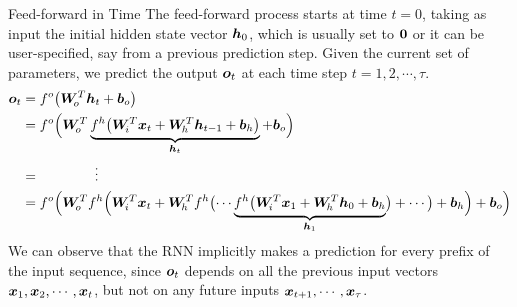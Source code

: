 %
\begin{frame}{Feed-forward in Time}
%
The feed-forward process starts at time $t=0$, taking as input the initial
hidden state vector ${\boldsymbol h}_0$, which is usually set to $\mathbf{0}$ or it can be
user-specified, say from a previous prediction step. Given the current set
of parameters, we predict the output ${\boldsymbol o}_t$ at each time step $t=1,2,\cdots,
\tau$.%
\begin{align*}
    \bo_t & = f^o \bigl( \bW_{\!o}^T \bh_t + \bb_{o} \bigr)\\
    & = f^o \Bigl( \bW_{\!o}^T 
        \underbrace{f^h \bigl(\bW_{\!i}^T \bx_t + \bW_{\!h}^T
        \bh_{t-1} + \bb_{h}\bigr)}_{\bh_t}
    + \bb_{o} \Bigr)\\
    & = \qquad \qquad \vdots\\
    & = f^o \Bigl( \bW_{\!o}^T 
        f^h \Bigl(\bW_{\!i}^T \bx_t + \bW_{\!h}^T
         f^h\bigl( \cdots 
           \underbrace{f^h\bigl(\bW_{\!i}^T \bx_{1} + \bW_{\!h}^T
               \bh_{0} + \bb_{h}}_{\bh_1} 
            \bigr) 
        +\cdots \bigr)
    + \bb_{h} \Bigr)
    + \bb_{o} \Bigr)
\end{align*}
We can observe that the RNN implicitly makes a prediction for every prefix of
the input sequence, since ${\boldsymbol o}_t$ depends on all the previous input vectors
${\boldsymbol x}_1, {\boldsymbol x}_2, \cdots, {\boldsymbol x}_t$, but not on any future inputs ${\boldsymbol x}_{t+1},
\cdots, {\boldsymbol x}_\tau$.
\end{frame}
%
%
